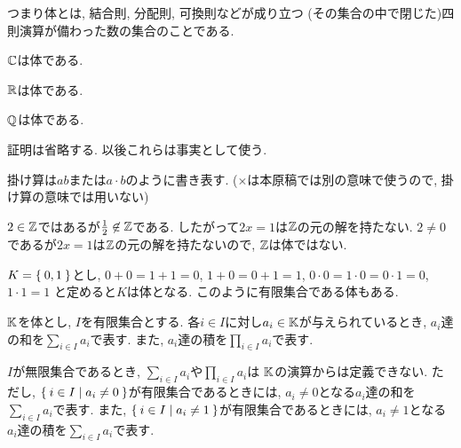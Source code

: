 \begin{remark}
  つまり体とは,
  結合則, 分配則, 可換則などが成り立つ
  (その集合の中で閉じた)四則演算が備わった数の集合のことである.
\end{remark}


\begin{example}
  $\mathbb{C}$は体である.
\end{example}
\begin{example}
  $\mathbb{R}$は体である.
\end{example}
\begin{example}
  $\mathbb{Q}$は体である.
\end{example}
\begin{remark}
  証明は省略する.
  以後これらは事実として使う.
\end{remark}
\begin{remark}
  掛け算は$ab$または$a\cdot b$のように書き表す.
  ($\times$は本原稿では別の意味で使うので,
  掛け算の意味では用いない)
\end{remark}

\begin{example}
  $2\in\mathbb{Z}$ではあるが$\frac{1}{2}\not\in \mathbb{Z}$である.
  したがって$2x=1$は$\mathbb{Z}$の元の解を持たない.
  $2\neq 0$であるが$2x=1$は$\mathbb{Z}$の元の解を持たないので,
  $\mathbb{Z}$は体ではない.
\end{example}

\begin{example}
\label{ex:f2}
$K=\Set{0,1}$とし,
$0+0=1+1=0$, $1+0=0+1=1$,
$0\cdot 0=1\cdot 0=0\cdot 1=0$, $1\cdot 1=1$
と定めると$K$は体となる.
このように有限集合である体もある.
\end{example}

$\mathbb{K}$を体とし,
$I$を有限集合とする.
各$i\in I$に対し$a_i\in \mathbb{K}$が与えられているとき,
$a_i$達の和を$\sum_{i\in I} a_i$で表す.
また,
$a_i$達の積を$\prod_{i\in I} a_i$で表す.

\begin{remark}
$I$が無限集合であるとき,
$\sum_{i\in I} a_i$や$\prod_{i\in I} a_i$は
$\mathbb{K}$の演算からは定義できない.
ただし,
$\Set{i \in I |a_i\neq 0}$が有限集合であるときには,
$a_i\neq 0$となる$a_i$達の和を$\sum_{i\in I} a_i$で表す.
また,
$\Set{i \in I |a_i\neq 1}$が有限集合であるときには,
$a_i\neq 1$となる$a_i$達の積を$\sum_{i\in I} a_i$で表す.
\end{remark}

